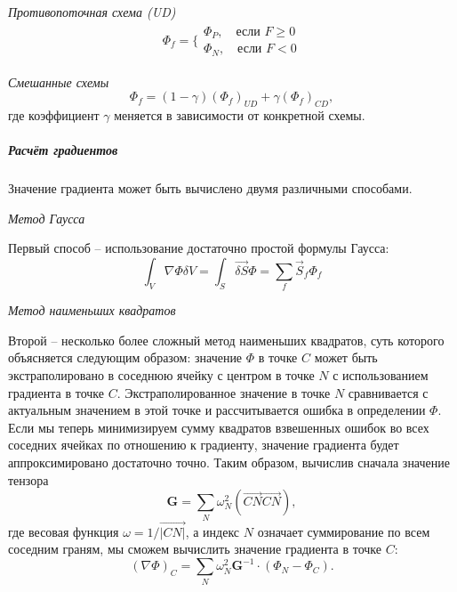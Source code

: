 		\textit{Противопоточная схема (UD)}
		\begin{equation}
			\begin{aligned}
				\Phi_f = \Bigg\{	\begin{array}{l}
					\Phi_P, \quad \text{если } F \geq 0 \\
					\Phi_N, \quad \text{если } F < 0
				\end{array}
			\end{aligned}
		\end{equation}
		
		\textit{Смешанные схемы}
		\begin{equation}
			\Phi_f = \left(1-\gamma\right)(\Phi_f)_{UD} + \gamma (\Phi_f)_{CD},
		\end{equation}
		где коэффициент $\gamma$ меняется в зависимости от конкретной схемы.
		
		\subparagraph{Расчёт градиентов\\}
		
		    Значение градиента может быть вычислено двумя различными способами.
			
			\textit{Метод Гаусса}
			
			Первый способ -- использование достаточно простой формулы Гаусса:
			\begin{equation}
				\int_V \nabla \Phi \delta V = \int_S \vec{\delta S} \Phi = \sum_f \vec{S}_f \Phi_f
			\end{equation}
			
			\textit{Метод наименьших квадратов}
			
			Второй -- несколько более сложный метод наименьших квадратов, суть которого объясняется следующим образом: значение $\Phi$ в точке $C$ может быть экстраполировано в соседнюю ячейку с центром в точке $N$ с использованием градиента в точке $C$. Экстраполированное значение в точке $N$ сравнивается с актуальным значением в этой точке и рассчитывается ошибка в определении $\Phi$. Если мы теперь минимизируем сумму квадратов взвешенных ошибок во всех соседних ячейках по отношению к градиенту, значение градиента будет аппроксимировано достаточно точно. Таким образом, вычислив сначала значение тензора
			\begin{equation}
				\mathbf{G} = \sum_N \omega_N^2 (\vec{CN}\vec{CN}),
			\end{equation}
			где весовая функция $\omega = 1/\vec{|CN|}$, а индекс $N$ означает суммирование по всем соседним граням, мы сможем вычислить значение градиента в точке $C$:
			\begin{equation}
				(\nabla \Phi)_C = \sum_N \omega_N^2 \mathbf{G}^{-1} \cdot  (\Phi_N - \Phi_C).
			\end{equation}
